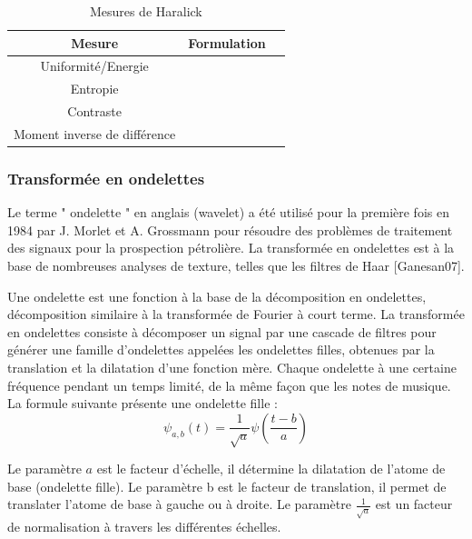 \begin{table}[H]
	\centering
	\begin{tabular}{|c|c|c|}
		
		\hline
		\textbf{ Mesure} & \textbf{  Formulation} \\
		\hline
		Uniformité/Energie & \makecell{$E = \sum_{i=0}^{n}\sum_{j=0}^{n} P_{d,\theta}(i, j) $ }    \\
		\hline
		Entropie & \makecell{$En = -\sum_{i=0}^{n}\sum_{j=0}^{n} P_{d,\theta}(i, j) \log_2 (P_{d,\theta}(i, j)) $}    \\
		\hline
		Contraste & \makecell{$ C = \sum_{i=0}^{n}\sum_{j=0}^{n} P_{d,\theta}(i, j) (i-j)^2 $} \\
		\hline
	Moment inverse de différence & \makecell{$ M = \frac{1}{1+(i-j)^2} \sum_{i=0}^{n}\sum_{j=0}^{n} P_{d,\theta}(i, j)  $}\\
	     \hline
	\end{tabular}
\caption{Mesures de Haralick}
\end{table}
 
 
\subsubsection{Transformée en ondelettes}
 Le terme " ondelette " en anglais (wavelet) a été utilisé pour la première fois en 1984 par J. Morlet et A. Grossmann pour résoudre des problèmes de traitement des signaux pour la prospection pétrolière. La transformée en ondelettes est à la base de nombreuses analyses de texture, telles que les filtres de Haar [Ganesan07].
 
 Une ondelette est une fonction à la base de la décomposition en ondelettes, décomposition similaire à la transformée de Fourier à court terme. La transformée en ondelettes consiste à décomposer un signal par une cascade de filtres pour générer une famille d'ondelettes appelées les ondelettes filles, obtenues par la translation et la dilatation d’une fonction mère. Chaque ondelette à une certaine fréquence pendant un temps limité, de la même façon que les notes de musique. La formule suivante présente une ondelette fille :
\begin{equation}
	\psi_{a,b}(t) = \frac{1}{\sqrt{a}}\psi(\frac{t-b}{a})
\end{equation}

Le paramètre $a$ est le facteur d’échelle, il détermine la dilatation de l'atome de base (ondelette fille). Le paramètre b est le facteur de translation, il permet de translater l'atome de base à gauche ou à droite. Le paramètre $ \frac{1}{\sqrt{a}} $ est un facteur de normalisation à travers les différentes échelles.\\


